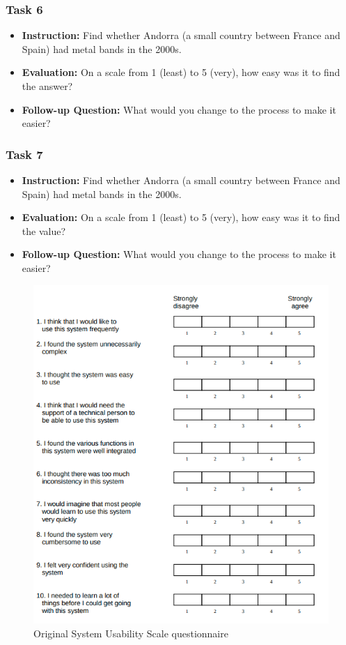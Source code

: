 \documentclass[twocolumn, letterpaper,13pt]{scrartcl}
\begin{document}
    \subsubsection*{Task 6}
    \begin{itemize}
        \item \textbf{Instruction:} Find whether Andorra (a small country between France and Spain) had metal bands in the 2000s.
        \item \textbf{Evaluation:} On a scale from 1 (least) to 5 (very), how easy was it to find the answer?
        \item \textbf{Follow-up Question:} What would you change to the process to make it easier?
    \end{itemize}

    \subsubsection*{Task 7}
    \begin{itemize}
        \item \textbf{Instruction:} Find whether Andorra (a small country between France and Spain) had metal bands in the 2000s.
        \item \textbf{Evaluation:} On a scale from 1 (least) to 5 (very), how easy was it to find the value?
        \item \textbf{Follow-up Question:} What would you change to the process to make it easier?
    \end{itemize}
    
    \begin{figure}	\includegraphics[width=0.98\linewidth]{SUS.png}
    \caption{Original System Usability Scale questionnaire\label{fig:a}}
    \end{figure}
    
\end{document}
